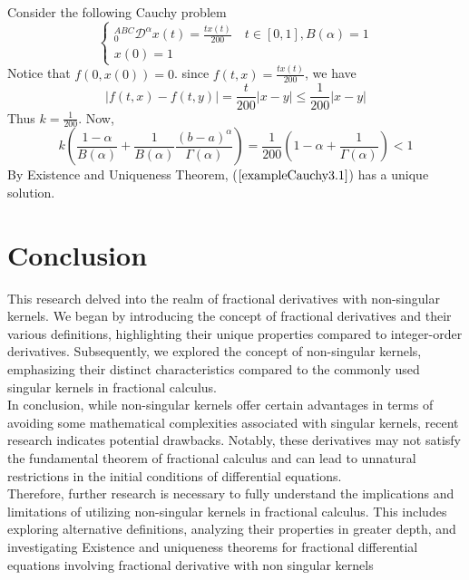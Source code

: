\documentclass[twoside]{book}
\begin{document}
{
\newpage
\begin{example}
    Consider the following Cauchy problem
    \begin{equation}
        \label{exampleCauchy3.1}
        \begin{cases}
            ^{ABC}_{0}\mathcal{D}^{\alpha} x(t) =  \frac{t x(t)}{200} \quad t \in [0,1], B(\alpha) = 1 \\
            x(0) = 1
        \end{cases}
    \end{equation}
    Notice that $f(0,x(0))=0$. since $f(t,x) = \frac{tx(t)}{200}$, we have
    \begin{equation}
        \label{33}
        |f(t,x)-f(t,y)| = \frac{t}{200} |x-y| \leq \frac{1}{200} |x-y|
    \end{equation}
    Thus $k= \frac{1}{200}$. Now,
    \begin{equation}
        \label{34}
        k \left(\frac{1-\alpha}{B(\alpha)} + \frac{1}{B(\alpha)} \frac{(b-a)^{\alpha}}{\Gamma{(\alpha)}}\right) = \frac{1}{200} \left(1-\alpha + \frac{1}{\Gamma{(\alpha)}}\right) < 1
    \end{equation}
    By Existence and Uniqueness Theorem, ($\ref{exampleCauchy3.1}$) has a unique solution.
\end{example}






\chapter*{Conclusion}

This research delved into the realm of fractional derivatives with non-singular kernels. We began by introducing the concept of fractional derivatives and their various definitions, highlighting their unique properties compared to integer-order derivatives. Subsequently, we explored the concept of non-singular kernels, emphasizing their distinct characteristics compared to the commonly used singular kernels in fractional calculus.\\
\newline
In conclusion, while non-singular kernels offer certain advantages in terms of avoiding some mathematical complexities associated with singular kernels, recent research indicates potential drawbacks. Notably, these derivatives may not satisfy the fundamental theorem of fractional calculus and can lead to unnatural restrictions in the initial conditions of differential equations.\\
\newline
Therefore, further research is necessary to fully understand the implications and limitations of utilizing non-singular kernels in fractional calculus. This includes exploring alternative definitions, analyzing their properties in greater depth, and investigating Existence and uniqueness theorems for fractional differential equations involving fractional derivative with non singular kernels


}
\end{document}

